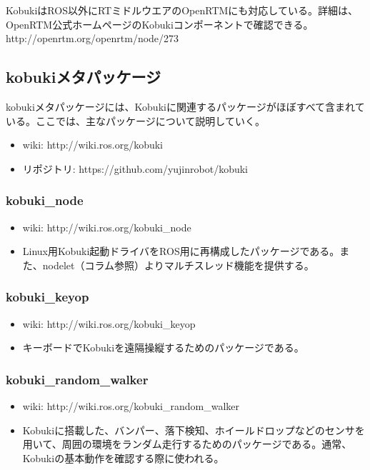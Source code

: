 \begin{itemize}
\begin{exercise}[OpenRTMサポートソフトウェア]
KobukiはROS以外にRTミドルウエアのOpenRTMにも対応している。詳細は、OpenRTM公式ホームページのKobukiコンポーネントで確認できる。
http://openrtm.org/openrtm/node/273
\end{exercise}

\subsection{kobukiメタパッケージ}

kobukiメタパッケージには、Kobukiに関連するパッケージがほぼすべて含まれている。ここでは、主なパッケージについて説明していく。

\begin{itemize}
\item wiki: http://wiki.ros.org/kobuki
\item リポジトリ: https://github.com/yujinrobot/kobuki
\end{itemize}

\subsubsection{kobuki\_node}

\begin{itemize}
\item wiki: http://wiki.ros.org/kobuki\_node
\item Linux用Kobuki起動ドライバをROS用に再構成したパッケージである。また、nodelet（コラム参照）よりマルチスレッド機能を提供する。
\end{itemize}

\subsubsection{kobuki\_keyop}

\begin{itemize}
\item wiki: http://wiki.ros.org/kobuki\_keyop
\item キーボードでKobukiを遠隔操縦するためのパッケージである。
\end{itemize}

\subsubsection{kobuki\_random\_walker}

\begin{itemize}
\item wiki: http://wiki.ros.org/kobuki\_random\_walker
\item Kobukiに搭載した、バンパー、落下検知、ホイールドロップなどのセンサを用いて、周囲の環境をランダム走行するためのパッケージである。通常、Kobukiの基本動作を確認する際に使われる。
\end{itemize}


\end{itemize}
